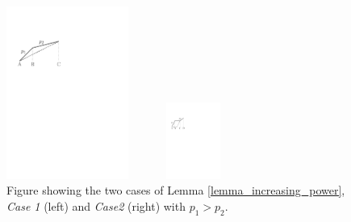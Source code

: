\begin{figure}[htb]
\begin{minipage}[b]{0.48\linewidth}
  \centering
  \centerline{\includegraphics[width=4cm]{Lemma1_case1.pdf}}
\end{minipage}
\begin{minipage}[b]{0.48\linewidth}
  \centering
  \centerline{\includegraphics[width=4cm,height=25mm]{Lemma1_case2.pdf}}
\end{minipage}
\caption{Figure showing the two cases of Lemma \ref{lemma_increasing_power}, \textit{Case 1} (left)  and \textit{Case2} (right) with $p_1>p_2$.}
\label{Lemma1}
\end{figure}

